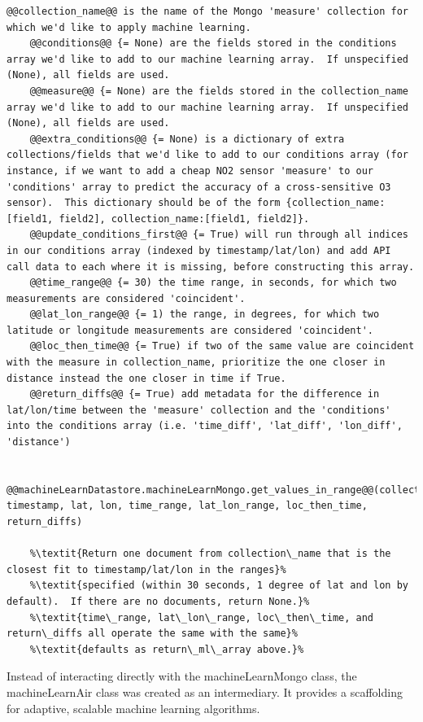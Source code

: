 \begin{lstlisting}[style=codedef]
	@@collection_name@@ is the name of the Mongo 'measure' collection for which we'd like to apply machine learning.
	@@conditions@@ {= None) are the fields stored in the conditions array we'd like to add to our machine learning array.  If unspecified (None), all fields are used.
	@@measure@@ {= None) are the fields stored in the collection_name array we'd like to add to our machine learning array.  If unspecified (None), all fields are used.
	@@extra_conditions@@ {= None) is a dictionary of extra collections/fields that we'd like to add to our conditions array (for instance, if we want to add a cheap NO2 sensor 'measure' to our 'conditions' array to predict the accuracy of a cross-sensitive O3 sensor).  This dictionary should be of the form {collection_name:[field1, field2], collection_name:[field1, field2]}.
	@@update_conditions_first@@ {= True) will run through all indices in our conditions array (indexed by timestamp/lat/lon) and add API call data to each where it is missing, before constructing this array.
	@@time_range@@ {= 30) the time range, in seconds, for which two measurements are considered 'coincident'.
	@@lat_lon_range@@ {= 1) the range, in degrees, for which two latitude or longitude measurements are considered 'coincident'.
	@@loc_then_time@@ {= True) if two of the same value are coincident with the measure in collection_name, prioritize the one closer in distance instead the one closer in time if True.
	@@return_diffs@@ {= True) add metadata for the difference in lat/lon/time between the 'measure' collection and the 'conditions' into the conditions array (i.e. 'time_diff', 'lat_diff', 'lon_diff', 'distance')

	
@@machineLearnDatastore.machineLearnMongo.get_values_in_range@@(collection_name, timestamp, lat, lon, time_range, lat_lon_range, loc_then_time, return_diffs)

	%\textit{Return one document from collection\_name that is the closest fit to timestamp/lat/lon in the ranges}%
	%\textit{specified (within 30 seconds, 1 degree of lat and lon by default).  If there are no documents, return None.}%
	%\textit{time\_range, lat\_lon\_range, loc\_then\_time, and return\_diffs all operate the same with the same}%
	%\textit{defaults as return\_ml\_array above.}%
\end{lstlisting}


Instead of interacting directly with the machineLearnMongo class, the machineLearnAir class was created as an intermediary.  It provides a scaffolding for adaptive, scalable machine learning algorithms.  

